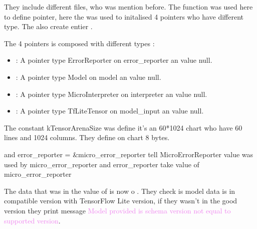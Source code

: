 They include different files, who was mention before. The function  was used here to define pointer, here the was used to initalised 4 pointers who have different type.
The also create entier .  

The 4 pointers is composed with different types : 
\begin{itemize}
    \item {}: A pointer type ErrorReporter on error\_reporter an value null.
    \item {}: A pointer type Model on model an value null.
    \item {}: A pointer type MicroInterpreter on interpreter an value null.
    \item {}: A pointer type TfLiteTensor on model\_input an value null.
\end{itemize}


\begin{center}
    \label{Magic Wand function}
\end{center}

The constant kTensorArenaSize was define it's an 60*1024 chart who have 60 lines and 1024 columns. They define  on chart 8 bytes. 

 and error\_reporter = \&micro\_error\_reporter  tell MicroErrorReporter value was used by micro\_error\_reporter and error\_reporter take value of micro\_error\_reporter 

\bigskip 

The data that was in the value of  is now o . They check is model data is in compatible version with TensorFlow Lite version, if they wasn't in the good version they print message \textcolor{violet}{Model provided is schema version not equal to supported version}.  

\begin{center}
    \label{Magic Wand function}
\end{center}

